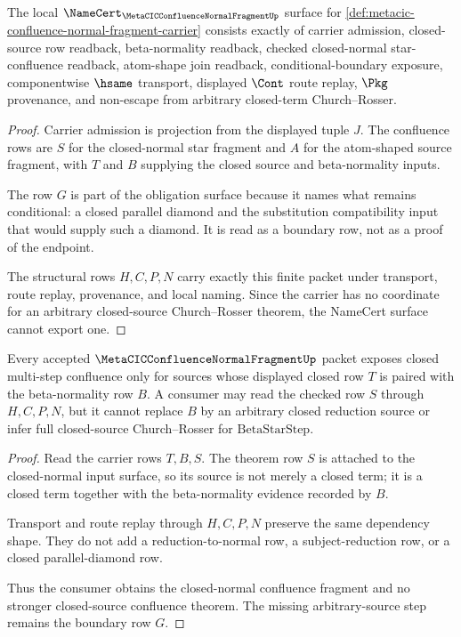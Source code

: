 \begin{theorem}
\label{thm:metacic-confluence-normal-fragment-namecert-obligations}
The local $\NameCert_{\MetaCICConfluenceNormalFragmentUp}$ surface for
\autoref{def:metacic-confluence-normal-fragment-carrier} consists exactly of
carrier admission, closed-source row readback, beta-normality readback,
checked closed-normal star-confluence readback, atom-shape join readback,
conditional-boundary exposure, componentwise $\hsame$ transport, displayed
$\Cont$ route replay, $\Pkg$ provenance, and non-escape from arbitrary
closed-term Church--Rosser.
\end{theorem}
\begin{proof}
Carrier admission is projection from the displayed tuple $J$. The confluence
rows are $S$ for the closed-normal star fragment and $A$ for the atom-shaped
source fragment, with $T$ and $B$ supplying the closed source and beta-normality
inputs.

The row $G$ is part of the obligation surface because it names what remains
conditional: a closed parallel diamond and the substitution compatibility input
that would supply such a diamond. It is read as a boundary row, not as a proof
of the endpoint.

The structural rows $H,C,P,N$ carry exactly this finite packet under transport,
route replay, provenance, and local naming. Since the carrier has no coordinate
for an arbitrary closed-source Church--Rosser theorem, the NameCert surface
cannot export one.
\end{proof}

\begin{theorem}
\label{thm:metacic-confluence-normal-fragment-closed-normal-scope}
Every accepted $\MetaCICConfluenceNormalFragmentUp$ packet exposes closed
multi-step confluence only for sources whose displayed closed row $T$ is paired
with the beta-normality row $B$. A consumer may read the checked row $S$ through
$H,C,P,N$, but it cannot replace $B$ by an arbitrary closed reduction source or
infer full closed-source Church--Rosser for $\mathrm{BetaStarStep}$.
\end{theorem}
\begin{proof}
Read the carrier rows $T,B,S$. The theorem row $S$ is attached to the
closed-normal input surface, so its source is not merely a closed term; it is a
closed term together with the beta-normality evidence recorded by $B$.

Transport and route replay through $H,C,P,N$ preserve the same dependency
shape. They do not add a reduction-to-normal row, a subject-reduction row, or a
closed parallel-diamond row.

Thus the consumer obtains the closed-normal confluence fragment and no stronger
closed-source confluence theorem. The missing arbitrary-source step remains the
boundary row $G$.
\end{proof}

